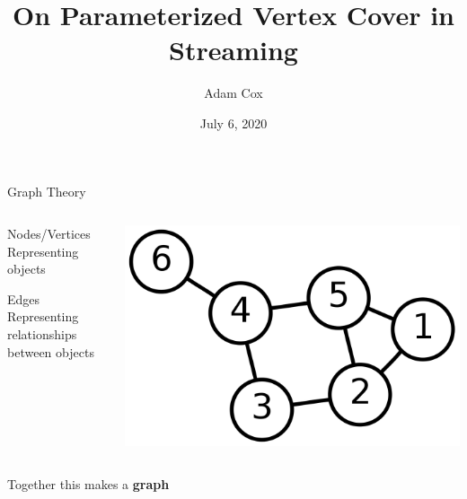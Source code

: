 \documentclass{beamer}
\title{On Parameterized Vertex Cover in Streaming}
\date{July 6, 2020}
\author{Adam Cox}
\institute{
    School of Computer Science \\
    University of Birmingham
}
\begin{document}
\maketitle

\begin{frame}{Graph Theory}
    \begin{columns}
        \begin{column}{0.55\textwidth}
            \begin{block}{Nodes/Vertices}
                Representing objects
            \end{block}
            \begin{block}{Edges}
                Representing relationships between objects
            \end{block}
        \end{column}
        \begin{column}{0.35\textwidth}
            \begin{center}
                \includegraphics[width=\textwidth]{graph-theory}
            \end{center}
        \end{column}
    \end{columns}

    \begin{center}
        Together this makes a \textbf{graph}
    \end{center}
\end{frame}
\end{document}
